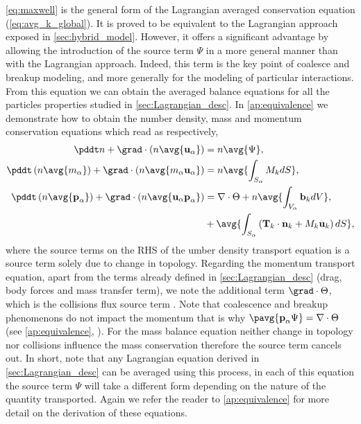 \ref{eq:maxwell} is the general form of the Lagrangian averaged conservation equation (\ref{eq:avg_k_global}). 
It is proved to be equivalent to the Lagrangian approach exposed in \ref{sec:hybrid_model}. 
However, it offers a significant advantage by allowing the introduction of the source term $\Psi$ in a more general manner than with the Lagrangian approach.
Indeed, this term is the key point of coalesce and breakup modeling, and more generally for the modeling of particular interactions. 
From this equation we can obtain the averaged balance equations for all the particles properties studied in \ref{sec:Lagrangian_desc}.
In \ref{ap:equivalence} we demonstrate how to obtain the number density, mass and momentum conservation equations which read as respectively,
\begin{align*}
    \pddt n
    + \grad \cdot \left(n \avg{\textbf{u}_\alpha}\right)
    &= n\avg{\Psi},\\
    \pddt \left(n\avg{m_\alpha}\right)
    + \grad \cdot \left(n \avg{m_\alpha \textbf{u}_\alpha}\right)
    &= n\avg{\int_{S_\alpha} M_k dS},\\
    \pddt \left( n \avg{\textbf{p}_\alpha}\right)
    + \grad \cdot \left(n \avg{\textbf{u}_\alpha \textbf{p}_\alpha}\right)
    &=  \nabla \cdot \Theta
    + n\avg{\int_{V_\alpha} \textbf{b}_k dV},\\
    &+ \avg{\int_{S_\alpha} \left(
    \textbf{T}_k\cdot\textbf{n}_k
    + M_k \textbf{u}_k
    \right)dS},
\end{align*}
where the source terms on the RHS of the umber density transport equation is a source term solely due to change in topology.
Regarding the momentum transport equation, apart from the terms already defined in \ref{sec:Lagrangian_desc} (drag, body forces and mass transfer term), we note the additional term $\grad\cdot\Theta$, which is the collisions flux source term \citep{curtiss1956kinetic}. 
Note that coalescence and breakup phenomenons do not impact the momentum that is why $\pavg{\textbf{p}_\alpha \Psi} = \nabla\cdot\Theta$ (see \ref{ap:equivalence}, \citep{KAMP20011363}). 
For the mass balance equation neither change in topology nor collisions influence the mass conservation therefore the source term cancels out. 
In short, note that any Lagrangian equation derived in \ref{sec:Lagrangian_desc} can be averaged using this process, in each of this equation the source term $\Psi$ will take a different form depending on the nature of the quantity transported. 
Again we refer the reader to \ref{ap:equivalence} for more detail on the derivation of these equations. 



